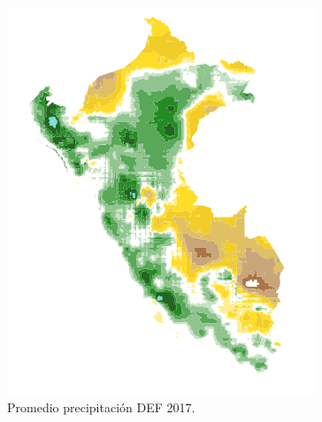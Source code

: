 \documentclass{article}
\begin{document}
\begin{figure}[h]
  \centering
  \begin{minipage}{0.45\textwidth}
      \centering
      \includegraphics[width=\textwidth]{./assets/2016_Diciembre.png}
      \caption{Promedio precipitación DEF 2017.}
  \end{minipage}
  \hfill
  \begin{minipage}{0.45\textwidth}
      \centering

\end{minipage}
\end{figure}
\end{document}
